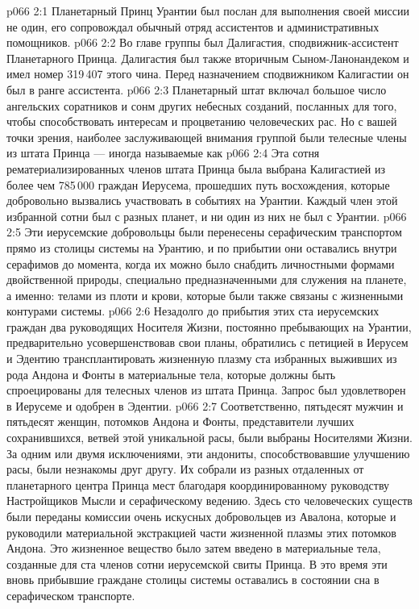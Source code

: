 \vs p066 2:1 Планетарный Принц Урантии был послан для выполнения своей миссии не один, его сопровождал обычный отряд ассистентов и административных помощников.
\vs p066 2:2 Во главе группы был Далигастия, сподвижник\hyp{}ассистент Планетарного Принца. Далигастия был также вторичным Сыном\hyp{}Ланонандеком и имел номер 319\,407 этого чина. Перед назначением сподвижником Калигастии он был в ранге ассистента.
\vs p066 2:3 Планетарный штат включал большое число ангельских соратников и сонм других небесных созданий, посланных для того, чтобы способствовать интересам и процветанию человеческих рас. Но с вашей точки зрения, наиболее заслуживающей внимания группой были телесные члены из штата Принца --- иногда называемые как 
\vs p066 2:4 \pc Эта сотня рематериализированных членов штата Принца была выбрана Калигастией из более чем 785\,000 граждан Иерусема, прошедших путь восхождения, которые добровольно вызвались участвовать в событиях на Урантии. Каждый член этой избранной сотни был с разных планет, и ни один из них не был с Урантии.
\vs p066 2:5 Эти иерусемские добровольцы были перенесены серафическим транспортом прямо из столицы системы на Урантию, и по прибытии они оставались внутри серафимов до момента, когда их можно было снабдить личностными формами двойственной природы, специально предназначенными для служения на планете, а именно: телами из плоти и крови, которые были также связаны с жизненными контурами системы.
\vs p066 2:6 \pc Незадолго до прибытия этих ста иерусемских граждан два руководящих Носителя Жизни, постоянно пребывающих на Урантии, предварительно усовершенствовав свои планы, обратились с петицией в Иерусем и Эдентию трансплантировать жизненную плазму ста избранных выживших из рода Андона и Фонты в материальные тела, которые должны быть спроецированы для телесных членов из штата Принца. Запрос был удовлетворен в Иерусеме и одобрен в Эдентии.
\vs p066 2:7 Соответственно, пятьдесят мужчин и пятьдесят женщин, потомков Андона и Фонты, представители лучших сохранившихся, ветвей этой уникальной расы, были выбраны Носителями Жизни. За одним или двумя исключениями, эти андониты, способствовавшие улучшению расы, были незнакомы друг другу. Их собрали из разных отдаленных от планетарного центра Принца мест благодаря координированному руководству Настройщиков Мысли и серафическому ведению. Здесь сто человеческих существ были переданы комиссии очень искусных добровольцев из Авалона, которые и руководили материальной экстракцией части жизненной плазмы этих потомков Андона. Это жизненное вещество было затем введено в материальные тела, созданные для ста членов сотни иерусемской свиты Принца. В это время эти вновь прибывшие граждане столицы системы оставались в состоянии сна в серафическом транспорте.
